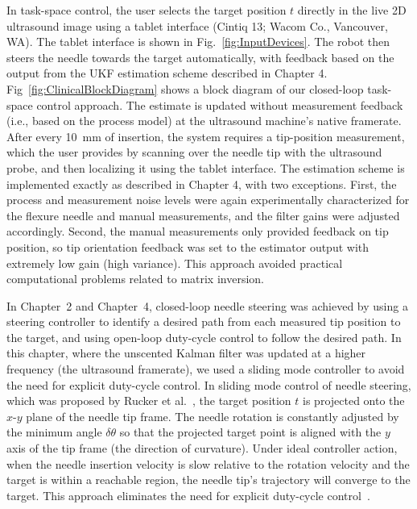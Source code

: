In task-space control, the user selects the target position $t$ directly in the live 2D ultrasound image using a tablet interface (Cintiq 13; Wacom Co., Vancouver, WA). The tablet interface is shown in Fig.~\ref{fig:InputDevices}. The robot then steers the needle towards the target automatically, with feedback based on the output from the UKF estimation scheme described in Chapter 4. Fig~\ref{fig:ClinicalBlockDiagram} shows a block diagram of our closed-loop task-space control approach. The estimate is updated without measurement feedback (i.e., based on the process model) at the ultrasound machine's native framerate. After every 10~mm of insertion, the system requires a tip-position measurement, which the user provides by scanning over the needle tip with the ultrasound probe, and then localizing it using the tablet interface. The estimation scheme is implemented exactly as described in Chapter 4, with two exceptions. First, the process and measurement noise levels were again experimentally characterized for the flexure needle and manual measurements, and the filter gains were adjusted accordingly. Second, the manual measurements only provided feedback on tip position, so tip orientation feedback was set to the estimator output with extremely low gain (high variance). This approach avoided practical computational problems related to matrix inversion. 

In Chapter~2 and Chapter~4, closed-loop needle steering was achieved by using a steering controller to identify a desired path from each measured tip position to the target, and using open-loop duty-cycle control to follow the desired path. In this chapter, where the unscented Kalman filter was updated at a higher frequency (the ultrasound framerate), we used a sliding mode controller to avoid the need for explicit duty-cycle control. In sliding mode control of needle steering, which was proposed by Rucker et al.~\cite{Rucker2013}, the target position $t$ is projected onto the $x$-$y$ plane of the needle tip frame. The needle rotation is constantly adjusted by the minimum angle $\delta\theta$ so that the projected target point is aligned with the $y$ axis of the tip frame (the direction of curvature). Under ideal controller action, when the needle insertion velocity is slow relative to the rotation velocity and the target is within a reachable region, the needle tip's trajectory will converge to the target. This approach eliminates the need for explicit duty-cycle control~\cite{Minhas2007}. 


